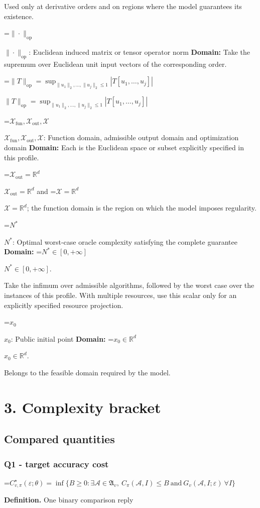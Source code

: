 \documentclass[10pt,a4paper]{article}
\newcommand{\AtlasMath}[1]{\par\begingroup\centering\setbox0=\hbox{$\displaystyle #1$}\ifdim\wd0>1.4\linewidth\typeout{ATLAS WIDE FORMULA: \the\wd0}\fi\ifdim\wd0>\linewidth\resizebox{\linewidth}{!}{\box0}\else\box0\fi\par\endgroup}
\newcommand{\AtlasInlineMath}[1]{\begingroup\setbox0=\hbox{$#1$}\ifdim\wd0>.4\linewidth\endgroup\AtlasMath{#1}\else\endgroup$#1$\fi}
\begin{document}
Used only at derivative orders and on regions where the model guarantees its existence.

\AtlasInlineMath{\|\cdot\|_{\mathrm{op}}}: Euclidean induced matrix or tensor operator norm \textbf{Domain:} Take the supremum over Euclidean unit input vectors of the corresponding order.

\AtlasInlineMath{\|T\|_{\mathrm{op}}=\sup_{\|u_1\|_2,\ldots,\|u_j\|_2\le1}|T[u_1,\ldots,u_j]|}

\AtlasInlineMath{\mathcal{X}_{\mathrm{fun}},\mathcal{X}_{\mathrm{out}},\mathcal{X}}: Function domain, admissible output domain and optimization domain \textbf{Domain:} Each is the Euclidean space or subset explicitly specified in this profile.

\AtlasInlineMath{\mathcal{X}_{\mathrm{out}}=\mathbb{R}^d} and \AtlasInlineMath{\mathcal{X}=\mathbb{R}^d}; the function domain is the region on which the model imposes regularity.

\AtlasInlineMath{N^*}: Optimal worst-case oracle complexity satisfying the complete guarantee \textbf{Domain:} \AtlasInlineMath{N^*\in[0,+\infty]}.

Take the infimum over admissible algorithms, followed by the worst case over the instances of this profile. With multiple resources, use this scalar only for an explicitly specified resource projection.

\AtlasInlineMath{x_0}: Public initial point \textbf{Domain:} \AtlasInlineMath{x_0\in\mathbb{R}^d}.

Belongs to the feasible domain required by the model.

\section{3. Complexity bracket}
\subsection{Compared quantities}
\subsubsection{Q1 - target accuracy cost}
\AtlasMath{C^\star_{v,\pi}(\varepsilon;\theta)=\inf\{B\ge0:\exists\mathcal A\in\mathfrak A_v,\ C_\pi(\mathcal A,I)\le B\ \text{and}\ G_v(\mathcal A,I;\varepsilon)\ \forall I\}}
\textbf{Definition.} One binary comparison reply
\end{document}

